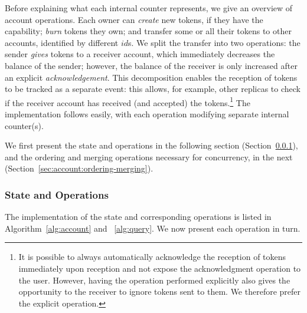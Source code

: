\documentclass[9pt, oneside]{article}   	%
\begin{document}
Before explaining what each internal counter represents, we give an overview of account operations. Each owner can  \textit{create} new tokens, if they have the capability; \textit{burn} tokens they own; and transfer some or all their tokens to other accounts, identified by different $id$s. We split the transfer into two operations: the sender \textit{gives} tokens to a receiver account, which immediately decreases the balance of the sender; however, the balance of the receiver is only increased after an explicit \textit{acknowledgement}. This decomposition enables the reception of tokens to be tracked as a separate event: this allows, for example, other replicas to check if the receiver account has received (and accepted) the tokens.\footnote{It is possible to always automatically acknowledge the reception of tokens immediately upon reception and not expose the acknowledgment operation to the user. However, having the operation performed explicitly also gives the opportunity to the receiver to ignore tokens sent to them. We therefore prefer the explicit operation.} The implementation follows easily, with each operation modifying separate internal counter(s). 

We first present the state and operations in the following section (Section~\ref{sec:account:state-operations}), and the ordering and merging operations necessary for concurrency, in the next (Section~\ref{sec:account:ordering-merging}).

\subsubsection{State and Operations}
\label{sec:account:state-operations}

The implementation of the state and corresponding operations is listed in Algorithm~\ref{alg:account} and ~\ref{alg:query}. We now present each operation in turn.
\end{document}
